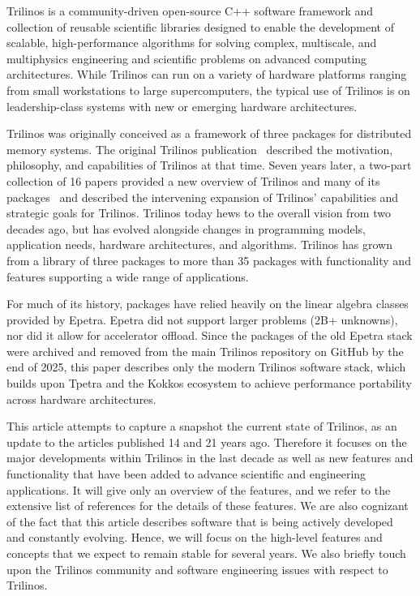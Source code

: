 
Trilinos is a community-driven open-source C++ software framework and collection of reusable scientific libraries designed to enable the development of scalable, high-performance algorithms for solving complex, multiscale, and multiphysics engineering and scientific problems on advanced computing architectures.
While Trilinos can run on a variety of hardware platforms ranging from small workstations to large supercomputers, the typical use of Trilinos is on leadership-class systems with new or emerging hardware architectures.

Trilinos was originally conceived as a framework of three packages for distributed memory systems. The original Trilinos publication~\cite{Heroux2005a} described the motivation, philosophy, and capabilities of Trilinos at that time. Seven years later, a two-part collection of 16 papers provided a new overview of Trilinos and many of its packages~\cite{Heroux2012,HerouxIntro2012part1,HerouxIntro2012part2,pawlowski2012automating,Oldfield2012,bochev2012,Boman2012,Baker2012,Kokkos2012,pawlowski2012automatingpart2,Spotz2012,Long2012,Morris2012,Howle2012,Bavier2012a,Gaidamour2012} and described the intervening expansion of Trilinos' capabilities and strategic goals for Trilinos. Trilinos today hews to the overall vision from two decades ago, but has evolved alongside changes in programming models, application needs, hardware architectures, and algorithms. Trilinos has grown from a library of three packages to more than 35 packages with functionality and features supporting a wide range of applications.

For much of its history, packages have relied heavily on the linear algebra classes provided by Epetra.
Epetra did not support larger problems (2B+ unknowns), nor did it allow for accelerator offload.
Since the packages of the old Epetra stack were archived and removed from the main Trilinos repository on GitHub by the end of 2025, this paper describes only the modern Trilinos software stack, which builds upon Tpetra and the Kokkos ecosystem to achieve performance portability across hardware architectures.

This article attempts to capture a snapshot the current state of Trilinos, as an update to the articles published 14 and 21 years ago.
Therefore it focuses on the major developments within Trilinos in the last decade as well as new features and functionality that have been added to advance scientific and engineering applications.
It will give only an overview of the features, and we refer to the extensive list of references for the details of these features.
We are also cognizant of the fact that this article describes software that is being actively developed and constantly evolving.
Hence, we will focus on the high-level features and concepts that we expect to remain stable for several years.
We also briefly touch upon the Trilinos community and software engineering issues with respect to Trilinos.

